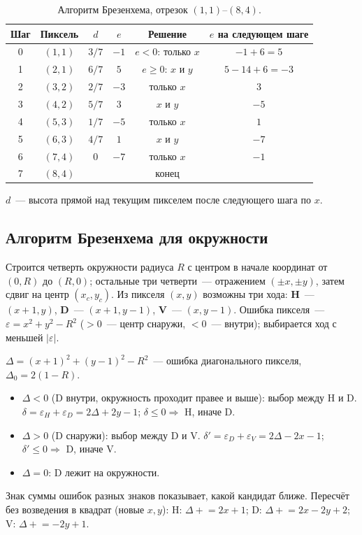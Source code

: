 \documentclass[11pt,a4paper]{article}
\begin{document}
\begin{table}[H]
\centering\small
\caption{Алгоритм Брезенхема, отрезок $(1,1)$--$(8,4)$.}
\begin{tabular}{cccccc}
\toprule
Шаг & Пиксель & $d$ & $e$ & Решение & $e$ на следующем шаге \\
\midrule
0 & $(1,1)$ & $3/7$ & $-1$ & $e < 0$: только $x$ & $-1 + 6 = 5$ \\
1 & $(2,1)$ & $6/7$ & $5$ & $e \ge 0$: $x$ и $y$ & $5 - 14 + 6 = -3$ \\
2 & $(3,2)$ & $2/7$ & $-3$ & только $x$ & $3$ \\
3 & $(4,2)$ & $5/7$ & $3$ & $x$ и $y$ & $-5$ \\
4 & $(5,3)$ & $1/7$ & $-5$ & только $x$ & $1$ \\
5 & $(6,3)$ & $4/7$ & $1$ & $x$ и $y$ & $-7$ \\
6 & $(7,4)$ & $0$ & $-7$ & только $x$ & $-1$ \\
7 & $(8,4)$ & & & конец & \\
\bottomrule
\end{tabular}
\end{table}
$d$~— высота прямой над текущим пикселем после следующего шага по $x$.

\subsection{Алгоритм Брезенхема для окружности}
Строится четверть окружности радиуса $R$ с центром в начале координат от $(0, R)$ до
$(R, 0)$; остальные три четверти~— отражением $(\pm x, \pm y)$, затем сдвиг на центр
$(x_c, y_c)$. Из пикселя $(x, y)$ возможны три хода: \textbf{H}~— $(x+1, y)$,
\textbf{D}~— $(x+1, y-1)$, \textbf{V}~— $(x, y-1)$. Ошибка пикселя~— $\varepsilon =
x^2 + y^2 - R^2$ ($>0$~— центр снаружи, $<0$~— внутри); выбирается ход с меньшей
$|\varepsilon|$.

$\Delta = (x+1)^2 + (y-1)^2 - R^2$~— ошибка диагонального пикселя, $\Delta_0 = 2(1 - R)$.
\begin{itemize}[label=--, leftmargin=1.5em, itemsep=0.1em, topsep=0.2em]
  \item $\Delta < 0$ (D внутри, окружность проходит правее и выше): выбор между H и D.
        $\delta = \varepsilon_H + \varepsilon_D = 2\Delta + 2y - 1$; $\delta \le 0 \Rightarrow$ H, иначе D.
  \item $\Delta > 0$ (D снаружи): выбор между D и V. $\delta' = \varepsilon_D + \varepsilon_V =
        2\Delta - 2x - 1$; $\delta' \le 0 \Rightarrow$ D, иначе V.
  \item $\Delta = 0$: D лежит на окружности.
\end{itemize}
Знак суммы ошибок разных знаков показывает, какой кандидат ближе. Пересчёт
без возведения в квадрат (новые $x, y$): H: $\Delta \mathrel{+}= 2x + 1$; D:
$\Delta \mathrel{+}= 2x - 2y + 2$; V: $\Delta \mathrel{+}= -2y + 1$.
\end{document}
